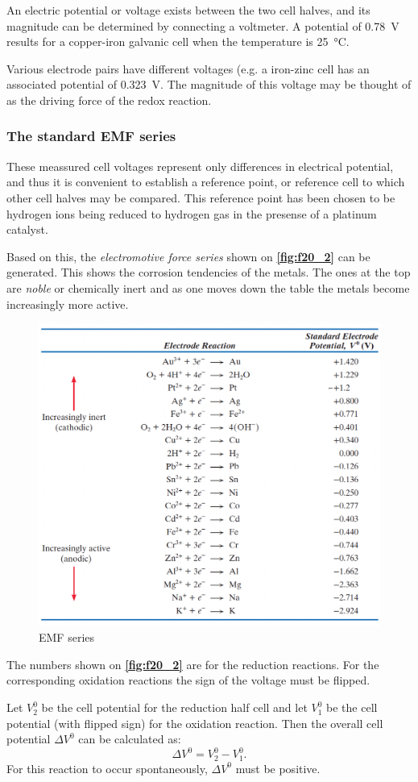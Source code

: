 An electric potential or voltage exists between the two cell halves, and its magnitude can be determined by connecting a voltmeter. A potential of \qty{0,78}{V}  results for a copper-iron galvanic cell when the temperature is \qty{25}{\celsius}. 

Various electrode pairs have different voltages (e.g. a iron-zinc cell has an associated potential of \qty{0,323}{V}. The magnitude of this voltage may be thought of as the driving force of the redox reaction. 

\subsubsection{The standard EMF series}
These meassured cell voltages represent only differences in electrical potential, and thus it is convenient to establish a reference point, or reference cell to which other cell halves may be compared. This reference point has been chosen to be hydrogen ions being reduced to hydrogen gas in the presense of a platinum catalyst.

Based on this, the \textit{electromotive force series} shown on \textbf{\autoref{fig:f20_2}} can be generated. This shows the corrosion tendencies of the metals. The ones at the top are \textit{noble} or chemically inert and as one moves down the table the metals become increasingly more active.
\begin{figure} [ht]
  \centering
  \includegraphics[width=0.5\linewidth]{./figures/f20_2.png}
  \caption{EMF series}
  \label{fig:f20_2}
\end{figure}

The numbers shown on \textbf{\autoref{fig:f20_2}} are for the reduction reactions. For the corresponding oxidation reactions the sign of the voltage must be flipped.

Let $V_2^{0}$ be the cell potential for the reduction half cell and let $V_1^{0}$ be the cell potential (with flipped sign) for the oxidation reaction. Then the overall cell potential $\Delta V^{0}$ can be calculated as:
\[ 
\Delta V^{0} = V_2^{0} - V_1^{0}
.\]
For this reaction to occur spontaneously, $\Delta V^{0}$ must be positive.

